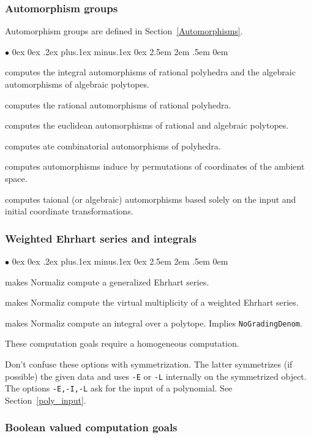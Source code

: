 \documentclass[12pt,a4paper]{scrartcl}
\newcommand{\stdli}{ \topsep0ex \partopsep0ex %
\parsep.2ex plus.1ex minus.1ex \itemsep0ex%
\leftmargin2.5em \labelwidth2em \labelsep.5em \rightmargin0em}%
\renewenvironment{itemize}{\begin{list}{{$\bullet$}}{\stdli}}{\end{list}}
\theoremstyle{definition}
\def\itemtt[#1]{\item[\textbf{\ttt{#1}}]}
\def\ttt{\texttt}
\begin{document}
\subsubsection{Automorphism groups}

Automorphism groups are defined in Section~\ref{Automorphisms}.
\begin{itemize}
	\itemtt[Automorphisms] computes the integral automorphisms of rational polyhedra and the algebraic automorphisms of algebraic polytopes.
	
	\itemtt [RationalAutomorphisms] computes the rational automorphisms of rational polyhedra.
	
	\itemtt[EuclideanAutomorphisms] computes the euclidean automorphisms of rational and algebraic polytopes.
	
	\itemtt [CombinatorialAutomorphisms] computes ate combinatorial automorphisms of polyhedra.
	
	\itemtt[AmbientAutomorphisms] computes automorphisms induce by permutations of coordinates of the ambient space.
	
	\itemtt[InputAutomorphisms] computes taional (or algebraic) automorphisms based solely on the input and initial coordinate transformations.
\end{itemize}

\subsubsection{Weighted Ehrhart series and integrals}

\begin{itemize}
	
	\itemtt[WeightedEhrhartSeries, -E] makes Normaliz compute a generalized Ehrhart series.
	
	\itemtt[VirtualMultiplicity, -L] makes Normaliz compute the virtual multiplicity of a weighted Ehrhart series.
	
	\itemtt[Integral, -I] makes Normaliz compute an integral over a polytope. Implies \verb|NoGradingDenom|.
\end{itemize}

These computation goals require a homogeneous computation.

Don't confuse these options with symmetrization. The latter symmetrizes (if possible) the given data and uses \verb|-E| or \verb|-L| internally on the symmetrized object. The options \verb|-E,-I,-L| ask for the input of a polynomial. See Section~\ref{poly_input}.

\subsubsection{Boolean valued computation goals}\label{bool}
\end{document}
